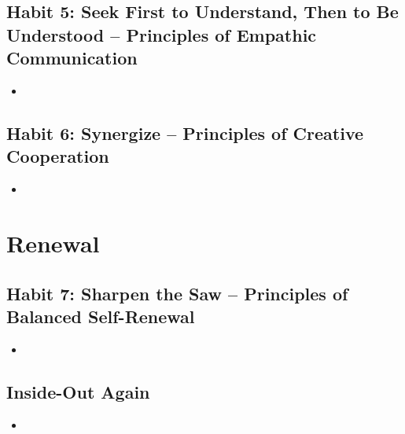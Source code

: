 \documentclass[11pt]{article}
\begin{document}
\subsection{Habit 5: Seek First to Understand, Then to Be Understood -- Principles of Empathic Communication}
\begin{itemize}
\item 
\end{itemize}
\subsection{Habit 6: Synergize -- Principles of Creative Cooperation}
\begin{itemize}
\item 
\end{itemize}
\section{Renewal}
\subsection{Habit 7: Sharpen the Saw -- Principles of Balanced Self-Renewal}
\begin{itemize}
\item 
\end{itemize}
\subsection{Inside-Out Again}
\begin{itemize}
\item 
\end{itemize}
\newpage


\end{document}
